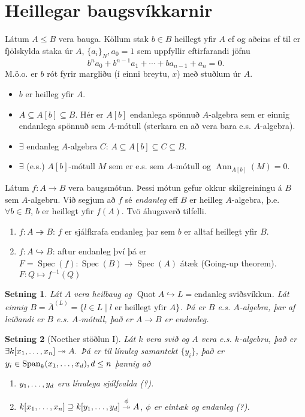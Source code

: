 \documentclass[a4paper, 14pt]{article}
\DeclareMathOperator{\Spec}{Spec}
\DeclareMathOperator{\Ann}{Ann}
\DeclareMathOperator{\Quot}{Quot}
\DeclareMathOperator{\Span}{Span}
\newtheorem{theorem}{Setning}
\begin{document}
\section{Heillegar baugsvíkkarnir}
Látum $A \leq B$ vera bauga. Köllum stak $b \in B$ heillegt yfir $A$ ef og aðeins ef til er
fjölskylda staka úr $A$, $\{ a_i \}_N, a_0 = 1$ sem uppfyllir eftirfarandi jöfnu
\[
    b^n a_0 + b^{n-1} a_1 + \cdots + ba_{n-1} + a_n = 0.
\]
M.ö.o. er $b$ rót fyrir margliðu (í einni breytu, $x$) með stuðlum úr $A$.
\begin{itemize}
\item $b$ er heilleg yfir $A$.
\item $A \subseteq A[b] \subseteq B$. Hér er $A[b]$ endanlega spönnuð $A$-algebra sem er einnig endanlega spönnuð sem $A$-mótull (sterkara en að vera bara e.s. $A$-algebra).  
\item $\exists$ endanleg $A$-algebra $C$: $A \subseteq A[b] \subseteq C \subseteq B$.
\item $\exists$ (e.s.) $A[b]$-mótull $M$ sem er e.s. sem $A$-mótull og $\Ann_{A[b]}(M) = 0$.
\end{itemize}

Látum $f: A \to B$ vera baugsmótun. Þessi mótun gefur okkur skilgreiningu á $B$ sem $A$-algebru.
Við segjum að $f$ sé \emph{endanleg} eff $B$ er heilleg $A$-algebra, þ.e. $\forall b \in B$, $b$ er heillegt yfir $f(A)$. 
Tvö áhugaverð tilfelli.
\begin{enumerate}
\item $f: A \twoheadrightarrow B$: $f$ er sjálfkrafa endanleg þar sem $b$ er alltaf heillegt yfir $B$.
\item $f: A \hookrightarrow B$: aftur endanleg því þá er $F=\Spec(f) : \Spec(B) \to \Spec(A)$ átæk (Going-up theorem).
    $F: Q \mapsto f^{-1}(Q)$ 
\end{enumerate}

\begin{theorem}
Lát $A$ vera heilbaug og $\Quot A \hookrightarrow L = \text{endanleg sviðsvíkkun}$.
Lát einnig $B = \overline{A}^{(L)} = \{ l \in L \mid l \text{ er heillegt yfir } A \}$.
Þá er $B$ e.s. $A$-algebra, þar af leiðandi er $B$ e.s. $A$-mótull, það er $A \to B$ er endanleg.
\end{theorem}

\begin{theorem}[Noether stöðlun I]
 Lát $k$ vera svið og $A$ vera e.s. $k$-algebru, það er $\exists k[\xs] \twoheadrightarrow A.$
Þá er til línuleg samantekt $\{ y_i \}$, það er $y_i \in \Span_k(\xs[x][d]), d \leq n$ þannig að 
\begin{enumerate}
\item $\xs[y][d]$ eru línulega sjálfvalda (?).
\item  $k[\xs] \supseteq k[\xs[y][d]] \overset{\phi}{\twoheadrightarrow} A$, $\phi$ er eintæk og endanleg (?).
\end{enumerate}
\end{theorem}
\end{document}
